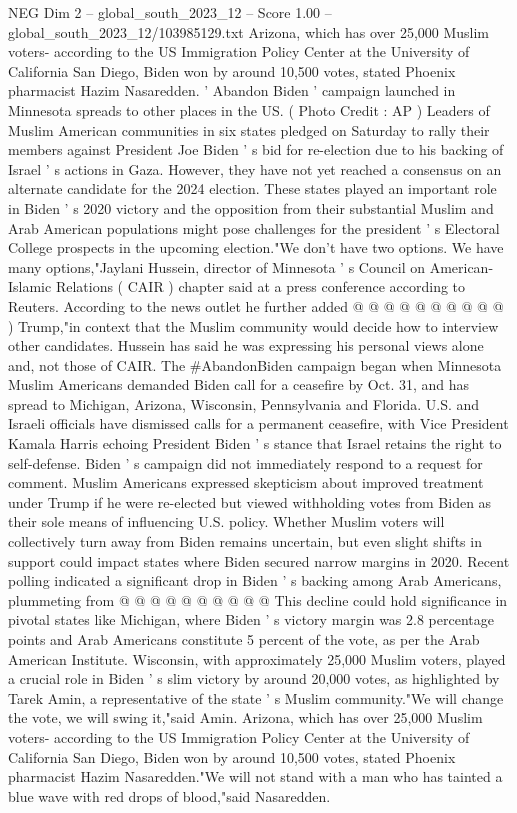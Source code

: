 \begin{textsample}{NEG Dim 2 – global\_south\_2023\_12 – Score 1.00 – global\_south\_2023\_12/103985129.txt}  \label{ex:f2_neg_284}
Arizona, which has over 25,000 Muslim voters- according to the US Immigration Policy Center at the University of California San Diego, Biden won by around 10,500 votes, stated Phoenix pharmacist Hazim Nasaredden. ' Abandon Biden ' campaign launched in Minnesota spreads to other places in the US. ( Photo Credit : AP ) Leaders of Muslim American communities in six states pledged on Saturday to rally their members against President Joe Biden ' s bid for re-election due to his backing of Israel ' s actions in Gaza.
However, they have not yet reached a consensus on an alternate candidate for the 2024 election.
These states played an important role in Biden ' s 2020 victory and the opposition from their substantial Muslim and Arab American populations might pose challenges for the president ' s Electoral College prospects in the upcoming election."We don't have two options.
We have many options,"Jaylani Hussein, director of Minnesota ' s Council on American-Islamic Relations ( CAIR ) chapter said at a press conference according to Reuters.
According to the news outlet he further added @ @ @ @ @ @ @ @ @ @ ) Trump,"in context that the Muslim community would decide how to interview other candidates.
Hussein has said he was expressing his personal views alone and, not those of CAIR.
The \#AbandonBiden campaign began when Minnesota Muslim Americans demanded Biden call for a ceasefire by Oct. 31, and has spread to Michigan, Arizona, Wisconsin, Pennsylvania and Florida.
U.S. and Israeli officials have dismissed calls for a permanent ceasefire, with Vice President Kamala Harris echoing President Biden ' s stance that Israel retains the right to self-defense.
Biden ' s campaign did not immediately respond to a request for comment.
Muslim Americans expressed skepticism about improved treatment under Trump if he were re-elected but viewed withholding votes from Biden as their sole means of influencing U.S. policy.
Whether Muslim voters will collectively turn away from Biden remains uncertain, but even slight shifts in support could impact states where Biden secured narrow margins in 2020.
Recent polling indicated a significant drop in Biden ' s backing among Arab Americans, plummeting from @ @ @ @ @ @ @ @ @ @ This decline could hold significance in pivotal states like Michigan, where Biden ' s victory margin was 2.8 percentage points and Arab Americans constitute 5 percent of the vote, as per the Arab American Institute.
Wisconsin, with approximately 25,000 Muslim voters, played a crucial role in Biden ' s slim victory by around 20,000 votes, as highlighted by Tarek Amin, a representative of the state ' s Muslim community."We will change the vote, we will swing it,"said Amin.
Arizona, which has over 25,000 Muslim voters- according to the US Immigration Policy Center at the University of California San Diego, Biden won by around 10,500 votes, stated Phoenix pharmacist Hazim Nasaredden."We will not stand with a man who has tainted a blue wave with red drops of blood,"said Nasaredden.

\end{textsample}
